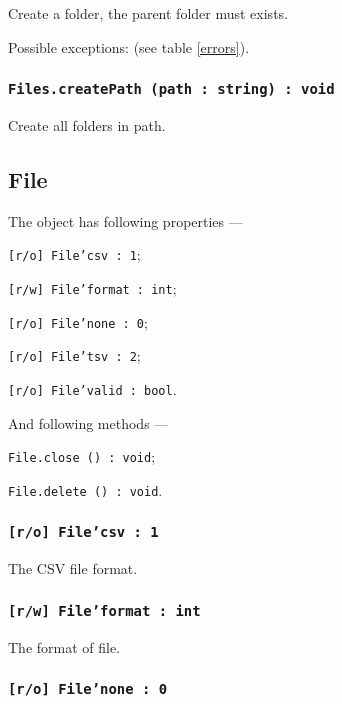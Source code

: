 Create a folder, the parent folder must exists.

Possible exceptions:  (see table \ref{errors}).

\subsubsection{\texttt{Files.createPath (path : string) : void}}

Create all folders in path.

\subsection{File}

The object \file{} has following properties —
\begin{icItems}
	\item \texttt{[r/o] File'csv : 1};
	\item \texttt{[r/w] File'format : int};
	\item \texttt{[r/o] File'none : 0};
	\item \texttt{[r/o] File'tsv : 2};
	\item \texttt{[r/o] File'valid : bool}.
\end{icItems}

And following methods —
\begin{icItems}
	\item \texttt{File.close () : void};
	\item \texttt{File.delete () : void}.
\end{icItems}

\subsubsection{\texttt{[r/o] File'csv : 1}}

The CSV file format.

\subsubsection{\texttt{[r/w] File'format : int}}

The format of file.

\subsubsection{\texttt{[r/o] File'none : 0}}

